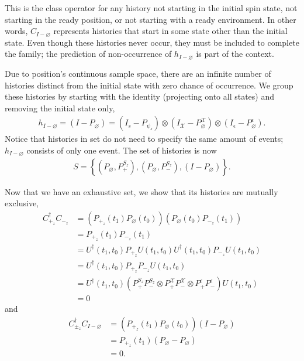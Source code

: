This is the class operator for any history not starting in the initial spin state, not starting in the ready position, or not starting with a ready environment. In other words, $C_{I-\varnothing}$ represents histories that start in some state other than the initial state. Even though these histories never occur, they must be included to complete the family; the prediction of non-occurrence of $h_{I - \varnothing}$ is part of the context.

Due to position's continuous sample space, there are an infinite number of histories distinct from the initial state with zero chance of occurrence. We group these histories by starting with the identity (projecting onto all states) and removing the initial state only,
\begin{align}
  h_{I-\varnothing} = \left(I - P_\varnothing \right) = \left(I_s - P_{\psi_s}\right) \otimes \left(I_\mathcal{X} - P_{\varnothing}^\mathcal{X} \right) \otimes \left(I_\epsilon - P^\epsilon_\varnothing \right).
\end{align}
Notice that histories in set do not need to specify the same amount of events; $h_{I-\varnothing}$ consists of only one event. The set of histories is now
\begin{align}
  S = \left\{\left( P_\varnothing, P^{S_z}_+ \right), \left(P_\varnothing, P^{S_z}_- \right), \left(I - P_\varnothing \right) \right\}.
\end{align}

Now that we have an exhaustive set, we show that its histories are mutually exclusive,
\begin{align}
  C_{+_z}^\dagger C_{-_z} &= \left( P_{+_z}(t_1)  P_\varnothing(t_0) \right) \left(P_\varnothing(t_0) P_{-_z}(t_1) \right) \\ \nonumber
  &= P_{+_z}(t_1) P_{-_z}(t_1) \\ \nonumber
  &= U^\dagger(t_1, t_0) P_{+_z} U(t_1, t_0) U^\dagger(t_1, t_0) P_{-_z} U(t_1, t_0)  \\ \nonumber
  &= U^\dagger(t_1, t_0) P_{+_z}P_{-_z} U(t_1, t_0) \\ \nonumber
  &= U^\dagger(t_1, t_0) \left( P^{S_z}_+ P^{S_z}_-  \otimes P^\mathcal{X}_+ P^\mathcal{X}_- \otimes P^\epsilon_+ P^\epsilon_- \right) U(t_1, t_0) \\ \nonumber
  &= 0
\end{align} and
\begin{align}
  C_{\pm_z}^\dagger C_{I-\varnothing} &= \left( P_{+_z}(t_1)  P_\varnothing(t_0) \right) \left(I-P_\varnothing\right) \\ \nonumber
  &= P_{+_z}(t_1)  \left(P_\varnothing - P_\varnothing \right)\\ \nonumber
  &= 0.
\end{align}

